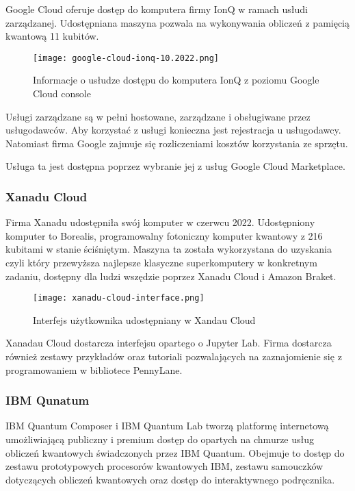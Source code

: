 \documentclass[a4paper,12pt
]{article}
\begin{document}
Google Cloud oferuje dostęp do komputera firmy IonQ w ramach usłudi
zarządzanej. Udostępniana maszyna pozwala na wykonywania obliczeń z
pamięcią kwantową 11 kubitów.

\begin{figure}
\centering
\texttt{[image: google-cloud-ionq-10.2022.png]}
\caption{Informacje o usłudze dostępu do komputera IonQ z poziomu
Google Cloud console}
\end{figure}

Usługi zarządzane są w pełni hostowane, zarządzane i obsługiwane przez
usługodawców. Aby korzystać z usługi konieczna jest rejestracja u
usługodawcy. Natomiast firma Google zajmuje się rozliczeniami kosztów
korzystania ze sprzętu.

Usługa ta jest dostępna poprzez wybranie jej z usług Google Cloud
Marketplace.

\hypertarget{xanadu-cloud}{%
\subsubsection{Xanadu Cloud}\label{xanadu-cloud}}

Firma Xanadu udostępniła swój komputer w czerwcu 2022. Udostępniony
komputer to Borealis, programowalny fotoniczny komputer kwantowy z 216
kubitami w stanie ściśniętym. Maszyna ta została wykorzystana do
uzyskania czyli który przewyższa najlepsze klasyczne superkomputery w
konkretnym zadaniu, dostępny dla ludzi wszędzie poprzez Xanadu Cloud i
Amazon Braket.

\begin{figure}
\centering
\texttt{[image: xanadu-cloud-interface.png]}
\caption{Interfejs użytkownika udostępniany w Xandau Cloud}
\end{figure}

Xanadau Cloud dostarcza interfejsu opartego o Jupyter Lab. Firma
dostarcza również zestawy przykładów oraz tutoriali pozwalających na
zaznajomienie się z programowaniem w bibliotece PennyLane.

\hypertarget{ibm-qunatum}{%
\subsubsection{IBM Qunatum}\label{ibm-qunatum}}

IBM Quantum Composer i IBM Quantum Lab tworzą platformę internetową
umożliwiającą publiczny i premium dostęp do opartych na chmurze usług
obliczeń kwantowych świadczonych przez IBM Quantum. Obejmuje to dostęp
do zestawu prototypowych procesorów kwantowych IBM, zestawu samouczków
dotyczących obliczeń kwantowych oraz dostęp do interaktywnego
podręcznika.
\end{document}
